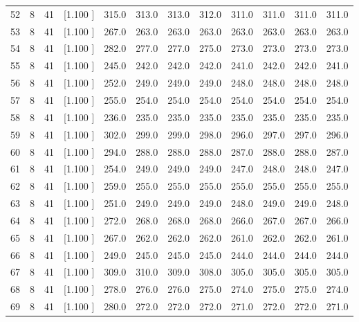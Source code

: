 \documentclass[12pt,a4paper]{article}
\begin{document}
\begin{center}
{\begin{tabular}{r r r r r r r r r r r r}
  52&  8& 41&[1.100     ]&   315.0&   313.0&   313.0&   312.0&   311.0&   311.0&   311.0&   311.0\\[-0.02in]
  53&  8& 41&[1.100     ]&   267.0&   263.0&   263.0&   263.0&   263.0&   263.0&   263.0&   263.0\\[-0.02in]
  54&  8& 41&[1.100     ]&   282.0&   277.0&   277.0&   275.0&   273.0&   273.0&   273.0&   273.0\\[-0.02in]
  55&  8& 41&[1.100     ]&   245.0&   242.0&   242.0&   242.0&   241.0&   242.0&   242.0&   241.0\\[-0.02in]
  56&  8& 41&[1.100     ]&   252.0&   249.0&   249.0&   249.0&   248.0&   248.0&   248.0&   248.0\\[-0.02in]
  57&  8& 41&[1.100     ]&   255.0&   254.0&   254.0&   254.0&   254.0&   254.0&   254.0&   254.0\\[-0.02in]
  58&  8& 41&[1.100     ]&   236.0&   235.0&   235.0&   235.0&   235.0&   235.0&   235.0&   235.0\\[-0.02in]
  59&  8& 41&[1.100     ]&   302.0&   299.0&   299.0&   298.0&   296.0&   297.0&   297.0&   296.0\\[-0.02in]
  60&  8& 41&[1.100     ]&   294.0&   288.0&   288.0&   288.0&   287.0&   288.0&   288.0&   287.0\\[-0.02in]
  61&  8& 41&[1.100     ]&   254.0&   249.0&   249.0&   249.0&   247.0&   248.0&   248.0&   247.0\\[-0.02in]
  62&  8& 41&[1.100     ]&   259.0&   255.0&   255.0&   255.0&   255.0&   255.0&   255.0&   255.0\\[-0.02in]
  63&  8& 41&[1.100     ]&   251.0&   249.0&   249.0&   249.0&   248.0&   249.0&   249.0&   248.0\\[-0.02in]
  64&  8& 41&[1.100     ]&   272.0&   268.0&   268.0&   268.0&   266.0&   267.0&   267.0&   266.0\\[-0.02in]
  65&  8& 41&[1.100     ]&   267.0&   262.0&   262.0&   262.0&   261.0&   262.0&   262.0&   261.0\\[-0.02in]
  66&  8& 41&[1.100     ]&   249.0&   245.0&   245.0&   245.0&   244.0&   244.0&   244.0&   244.0\\[-0.02in]
  67&  8& 41&[1.100     ]&   309.0&   310.0&   309.0&   308.0&   305.0&   305.0&   305.0&   305.0\\[-0.02in]
  68&  8& 41&[1.100     ]&   278.0&   276.0&   276.0&   275.0&   274.0&   275.0&   275.0&   274.0\\[-0.02in]
  69&  8& 41&[1.100     ]&   280.0&   272.0&   272.0&   272.0&   271.0&   272.0&   272.0&   271.0\\[-0.02in]

\end{tabular}}
\end{center}
\end{document}
